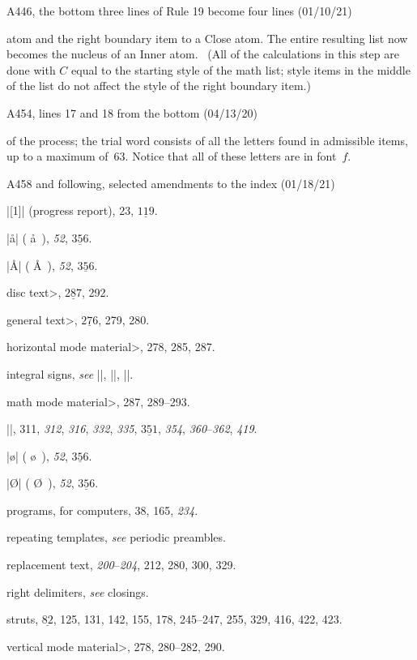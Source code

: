 \bugonpage A446, the bottom three lines of Rule 19 become four lines (01/10/21)

\ninepoint\noindent
atom and the right boundary item to
a Close atom. The entire resulting list now becomes the nucleus of an
Inner atom. \ (All of the calculations in this step are done with
$C$ equal to the starting style of the math list; style items in the
middle of the list do not affect the style of the right boundary item.)

\bugonpage A454, lines 17 and 18 from the bottom (04/13/20)

\ninepoint\noindent
of the process; the trial word consists of all the letters found in admissible
items, up to a maximum of~63. Notice that all of these letters are in font~$f$.

\bugonpage A458 and following, selected amendments to the index (01/18/21)

\eightpoint
|[1]| (progress report), 23, $\underline{119}$.\par
|\aa| ( \aa\ ), {\it52}, $\underline{356}$.\par
|\AA| ( \AA\ ), {\it52}, $\underline{356}$.\par
\<disc text>, $\underline{287}$, 292.\par
\<general text>, $\underline{276}$, 279, 280.\par
\<horizontal mode material>, 278, 285, 287.\par
integral signs, {\sl see\/} |\int|, |\oint|, |\smallint|.\par
\<math mode material>, 287, 289--293.\par
|\null|, 311, {\it312}, {\it316}, {\it332}, {\it335}, $\underline{351}$, {\it354}, {\it360}--{\it362}, {\it419}.\par
|\o| ( \o\ ), {\it52}, $\underline{356}$.\par
|\O| ( \O\ ), {\it52}, $\underline{356}$.\par
programs, for computers, 38, 165, {\it234}.\par
repeating templates, {\sl see\/} periodic preambles.\par
replacement text, {\it200}--{\it204}, 212, 280, 300, 329.\par
right delimiters, {\sl see\/} closings.\par
struts, $\underline{82}$, 125, 131, 142, 155, 178, 245--247, 255, 329, 416, 422, 423.\par
\<vertical mode material>, 278, 280--282, 290.


\def\\#1{\hbox{\it#1\/\kern.05em}} %
\def\dts{\mathrel{.\,.}} %

